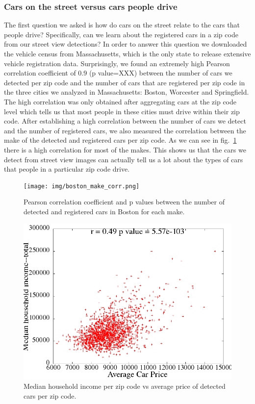 \documentclass[10pt,twocolumn,letterpaper]{article}
\begin{document}
\subsubsection{Cars on the street versus cars people drive}
The first question we asked is how do cars on the street relate to the cars that people drive? Specifically,
can we learn about the registered cars in a zip code from our street view detections?
In order to answer this question we downloaded the vehicle census from Massachusetts, which is the only state to release extensive vehicle registration data. Surprisingly, we found an extremely high Pearson correlation coefficient of 0.9 (p value=XXX) between the number of cars we detected per zip code and the number of cars that are registered per zip code in the three cities we analyzed in Massachusetts: Boston, Worcester and Springfield. The high correlation was only obtained after aggregating cars at the zip code level which tells us that most people in these cities must drive within their zip code. 
After establishing a high correlation between the number of cars we detect and the number of registered cars, we also measured the correlation between the make of the detected and registered cars per zip code. As we can see in fig.~\ref{fig:ma_corrs} there is a high correlation for most of the makes. This shows us that the cars we detect from street view images can actually tell us a lot about the types of cars that people in a particular zip code drive.

\begin{figure} [t]
\begin{center}
\texttt{[image: img/boston\_make\_corr.png]}
\end{center}
\caption {Pearson correlation coefficient and p values between the number of detected and registered cars in Boston for each make.}
\label{fig:ma_corrs}
\end{figure}


\begin{figure}[t]
\begin{center}
   \includegraphics[width=0.8\linewidth]{img/averagePriceIncome.png}
\end{center}
   \caption {Median household income per zip code vs average price of detected cars per zip code.}
\label{fig:price-income-corr}
\end{figure}
\end{document}
